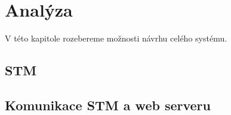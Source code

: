 \chapter{Analýza}

V této kapitole rozebereme možnosti návrhu celého systému.

\section{STM}



\section{Komunikace STM a web serveru}

